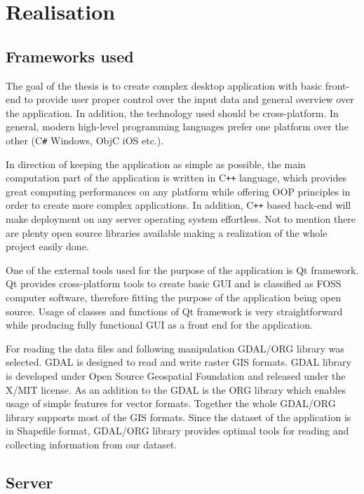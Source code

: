 \documentclass[thesis=M,english]{FITthesis}[2012/10/20]
\begin{document}
\chapter{Realisation}
\label{ch:Realisation}

\section{Frameworks used}
The goal of the thesis is to create complex desktop application with basic front-end to provide user proper control over the input data and general overview over the application. In addition, the technology used should be cross-platform. In general, modern high-level programming languages prefer one platform over the other (C\texttt{\#} Windows, ObjC iOS etc.). 

In direction of keeping the application as simple as possible, the main computation part of the application is written in C\texttt{++} language, which provides great computing performances on any platform while offering OOP principles in order to create more complex applications. In addition, C\texttt{++} based back-end will make deployment on any server operating system effortless. Not to mention there are plenty open source libraries available making a realization of the whole project easily done.  

One of the external tools used for the purpose of the application is Qt framework. Qt provides cross-platform tools to create basic GUI and is classified as FOSS computer software, therefore fitting the purpose of the application being open source. 
Usage of classes and functions of Qt framework is very straightforward while producing fully functional GUI as a front end for the application. 

For reading the data files and following manipulation GDAL/ORG library was selected. GDAL is designed to read and write raster GIS formats. GDAL library is developed under Open Source Geospatial Foundation and released under the X/MIT license. 
As an addition to the GDAL is the ORG library which enables usage of simple features for vector formats. Together the whole GDAL/ORG library supports most of the GIS formats. %
Since the dataset of the application is in Shapefile format, GDAL/ORG library provides optimal tools for reading and collecting information from our dataset.

\section{Server}
\end{document}
